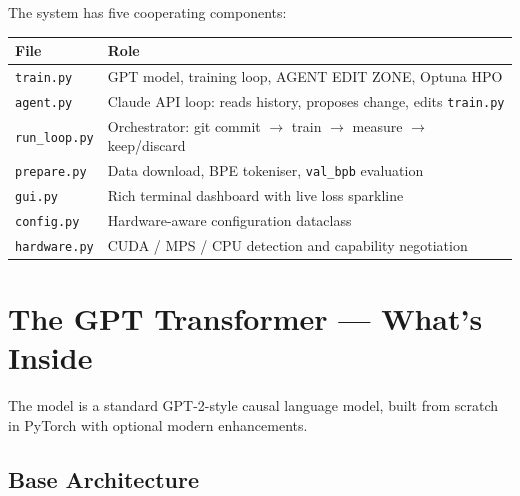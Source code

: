\documentclass[12pt, a4paper]{article}
\newcommand{\bpb}{\texttt{val\_bpb}}
\newcommand{\trainpy}{\texttt{train.py}}
\newcommand{\file}[1]{\texttt{#1}}
\begin{document}
The system has five cooperating components:

\begin{center}
\begin{tabularx}{\linewidth}{@{}lX@{}}
\toprule
\textbf{File} & \textbf{Role} \\
\midrule
\file{train.py}    & GPT model, training loop, AGENT EDIT ZONE, Optuna HPO \\
\file{agent.py}    & Claude API loop: reads history, proposes change, edits \trainpy{} \\
\file{run\_loop.py}& Orchestrator: git commit $\to$ train $\to$ measure $\to$ keep/discard \\
\file{prepare.py}  & Data download, BPE tokeniser, \bpb{} evaluation \\
\file{gui.py}      & Rich terminal dashboard with live loss sparkline \\
\file{config.py}   & Hardware-aware configuration dataclass \\
\file{hardware.py} & CUDA / MPS / CPU detection and capability negotiation \\
\bottomrule
\end{tabularx}
\end{center}

\section{The GPT Transformer — What's Inside}

The model is a standard GPT-2-style causal language model, built from scratch in PyTorch with
optional modern enhancements.

\subsection{Base Architecture}
\end{document}
